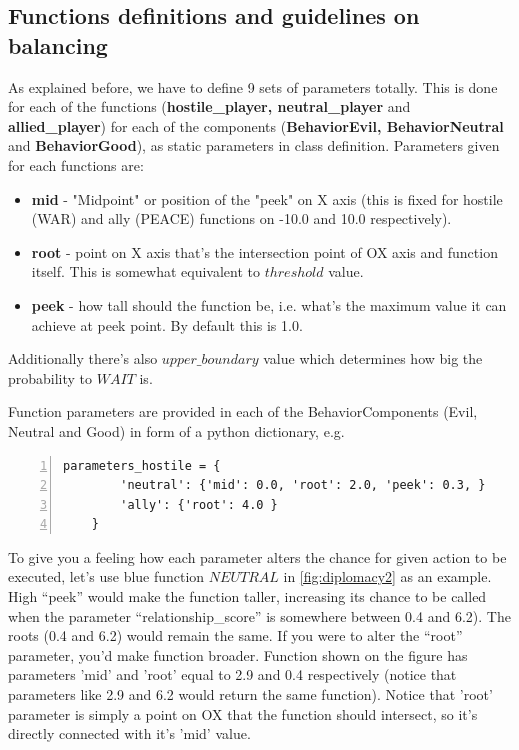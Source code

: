 \subsection{Functions definitions and guidelines on balancing}
	As explained before, we have to define 9 sets of parameters totally. 
	This is done for each of the functions (\textbf{hostile\_player, neutral\_player} and \textbf{allied\_player}) for each of the components (\textbf{BehaviorEvil, BehaviorNeutral} and \textbf{BehaviorGood}), as static parameters in class definition.
	Parameters given for each functions are:
	\begin{itemize}
		\item \textbf{mid} - "Midpoint" or position of the "peek" on X axis (this is fixed for hostile (WAR) and ally (PEACE) functions on -10.0 and 10.0 respectively).
		\item \textbf{root} - point on X axis that's the intersection point of OX axis and function itself. This is somewhat equivalent to $threshold$ value.
		\item \textbf{peek} - how tall should the function be, i.e. what's the maximum value it can achieve at peek point. By default this is 1.0.
	\end{itemize}

	Additionally there's also $upper\_boundary$ value which determines how big the probability to $WAIT$ is.

	Function parameters are provided in each of the BehaviorComponents (Evil, Neutral and Good) in form of a python dictionary, e.g.
\begin{Verbatim}[frame=lines, numbers=left]
	parameters_hostile = {
		'neutral': {'mid': 0.0, 'root': 2.0, 'peek': 0.3, }
		'ally': {'root': 4.0 }
	}
\end{Verbatim}

	To give you a feeling how each parameter alters the chance for given action to be executed, let's use blue function $NEUTRAL$ in \ref{fig:diplomacy2} as an example. 
	High ``peek'' would make the function taller, increasing its chance to be called when the parameter ``relationship\_score'' is somewhere between 0.4 and 6.2). 
	The roots (0.4 and 6.2) would remain the same. If you were to alter the ``root'' parameter, you'd make function broader. 
	Function shown on the figure has parameters 'mid' and 'root' equal to 2.9 and 0.4 respectively (notice that parameters like 2.9 and 6.2 would return the same function). 
	Notice that 'root' parameter is simply a point on OX that the function should intersect, so it's directly connected with it's 'mid' value.
